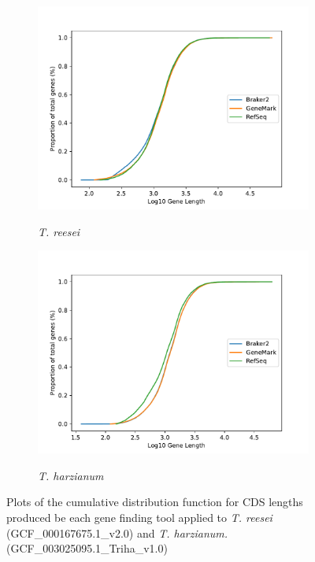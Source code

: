 \begin{figure}
  \centering
  \begin{subfigure}{0.7\textwidth}
    \includegraphics[width=\textwidth]{figures/t-reesei-cdf-lengths-log.pdf}
    \label{fig:treesei-lengths}
    \caption{\textit{T. reesei}}
  \end{subfigure}
  \begin{subfigure}{0.7\textwidth}
    \includegraphics[width=\textwidth]{figures/t-harzianum-cdf-lengths-log.pdf}
    \label{fig:tharzianum-lengths}
    \caption{\textit{T. harzianum}}
  \end{subfigure}
  \caption[CDF plots part 2.]{Plots of the cumulative distribution
    function for CDS lengths produced be each gene finding tool
    applied to \textit{T. reesei} (GCF\_000167675.1\_v2.0) and
    \textit{T. harzianum.} (GCF\_003025095.1\_Triha\_v1.0)}
  \label{fig:cdf-lengths-2}
\end{figure}

